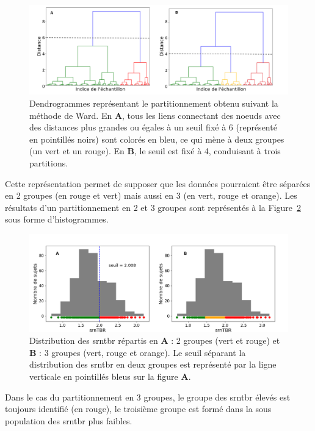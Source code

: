 \begin{figure}[h!]
  \centering
	\includegraphics[width=1\linewidth]{figures/chapter-4/tbr-dendrogram-ward} 
  \caption{Dendrogrammes représentant le partitionnement obtenu suivant la méthode de Ward. En \textbf{A}, tous les liens connectant des noeuds 
	avec des distances plus grandes ou égales à un seuil fixé à 6 (représenté en pointillés noirs) sont colorés en bleu, ce qui mène à deux groupes	
	(un vert et un rouge). En \textbf{B}, le seuil est fixé à 4, conduisant à trois partitions.}
  \label{Figure:tbr_ward_dendrogram}
\end{figure}

Cette représentation permet de supposer que les données pourraient être séparées en 2 groupes (en rouge et vert) 
mais aussi en 3 (en vert, rouge et orange). Les résultats d'un partitionnement en 2 et 3 groupes sont représentés 
à la Figure~\ref{Figure:tbr_ward_histograms} sous forme d'histogrammes.

\begin{figure}[h!]
  \centering
	\includegraphics[width=1.0\linewidth]{figures/chapter-4/tbr-histogram-ward} 
  \caption{Distribution des \gls{srntbr} répartis en \textbf{A} : 2 groupes (vert et rouge) et \textbf{B} : 3 groupes 
	(vert, rouge et orange). Le seuil séparant la distribution des \gls{srntbr} en deux groupes est représenté par la ligne verticale en pointillés bleus sur la 
	figure \textbf{A}.}
  \label{Figure:tbr_ward_histograms}
\end{figure}

Dans le cas du partitionnement en 3 groupes, le groupe des \gls{srntbr} élevés est toujours identifié (en rouge), le troisième groupe est formé dans 
la sous population des \gls{srntbr} plus faibles. 

